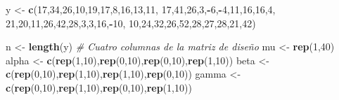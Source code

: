 \documentclass[
]{article}
\newenvironment{Shaded}{\begin{snugshade}}{\end{snugshade}}
\newcommand{\CommentTok}[1]{\textcolor[rgb]{0.56,0.35,0.01}{\textit{#1}}}
\newcommand{\DecValTok}[1]{\textcolor[rgb]{0.00,0.00,0.81}{#1}}
\newcommand{\FunctionTok}[1]{\textcolor[rgb]{0.13,0.29,0.53}{\textbf{#1}}}
\newcommand{\NormalTok}[1]{#1}
\newcommand{\OtherTok}[1]{\textcolor[rgb]{0.56,0.35,0.01}{#1}}
\newcommand{\SpecialCharTok}[1]{\textcolor[rgb]{0.81,0.36,0.00}{\textbf{#1}}}
\begin{document}
\begin{Shaded}
\begin{Highlighting}[]
\NormalTok{y }\OtherTok{\textless{}{-}} \FunctionTok{c}\NormalTok{(}\DecValTok{17}\NormalTok{,}\DecValTok{34}\NormalTok{,}\DecValTok{26}\NormalTok{,}\DecValTok{10}\NormalTok{,}\DecValTok{19}\NormalTok{,}\DecValTok{17}\NormalTok{,}\DecValTok{8}\NormalTok{,}\DecValTok{16}\NormalTok{,}\DecValTok{13}\NormalTok{,}\DecValTok{11}\NormalTok{,}
       \DecValTok{17}\NormalTok{,}\DecValTok{41}\NormalTok{,}\DecValTok{26}\NormalTok{,}\DecValTok{3}\NormalTok{,}\SpecialCharTok{{-}}\DecValTok{6}\NormalTok{,}\SpecialCharTok{{-}}\DecValTok{4}\NormalTok{,}\DecValTok{11}\NormalTok{,}\DecValTok{16}\NormalTok{,}\DecValTok{16}\NormalTok{,}\DecValTok{4}\NormalTok{,}
       \DecValTok{21}\NormalTok{,}\DecValTok{20}\NormalTok{,}\DecValTok{11}\NormalTok{,}\DecValTok{26}\NormalTok{,}\DecValTok{42}\NormalTok{,}\DecValTok{28}\NormalTok{,}\DecValTok{3}\NormalTok{,}\DecValTok{3}\NormalTok{,}\DecValTok{16}\NormalTok{,}\SpecialCharTok{{-}}\DecValTok{10}\NormalTok{,}
       \DecValTok{10}\NormalTok{,}\DecValTok{24}\NormalTok{,}\DecValTok{32}\NormalTok{,}\DecValTok{26}\NormalTok{,}\DecValTok{52}\NormalTok{,}\DecValTok{28}\NormalTok{,}\DecValTok{27}\NormalTok{,}\DecValTok{28}\NormalTok{,}\DecValTok{21}\NormalTok{,}\DecValTok{42}\NormalTok{)}

\NormalTok{n }\OtherTok{\textless{}{-}} \FunctionTok{length}\NormalTok{(y)}
\CommentTok{\# Cuatro columnas de la matriz de diseño}
\NormalTok{mu }\OtherTok{\textless{}{-}} \FunctionTok{rep}\NormalTok{(}\DecValTok{1}\NormalTok{,}\DecValTok{40}\NormalTok{)}
\NormalTok{alpha }\OtherTok{\textless{}{-}} \FunctionTok{c}\NormalTok{(}\FunctionTok{rep}\NormalTok{(}\DecValTok{1}\NormalTok{,}\DecValTok{10}\NormalTok{),}\FunctionTok{rep}\NormalTok{(}\DecValTok{0}\NormalTok{,}\DecValTok{10}\NormalTok{),}\FunctionTok{rep}\NormalTok{(}\DecValTok{0}\NormalTok{,}\DecValTok{10}\NormalTok{),}\FunctionTok{rep}\NormalTok{(}\DecValTok{1}\NormalTok{,}\DecValTok{10}\NormalTok{))}
\NormalTok{beta }\OtherTok{\textless{}{-}} \FunctionTok{c}\NormalTok{(}\FunctionTok{rep}\NormalTok{(}\DecValTok{0}\NormalTok{,}\DecValTok{10}\NormalTok{),}\FunctionTok{rep}\NormalTok{(}\DecValTok{1}\NormalTok{,}\DecValTok{10}\NormalTok{),}\FunctionTok{rep}\NormalTok{(}\DecValTok{1}\NormalTok{,}\DecValTok{10}\NormalTok{),}\FunctionTok{rep}\NormalTok{(}\DecValTok{0}\NormalTok{,}\DecValTok{10}\NormalTok{))}
\NormalTok{gamma }\OtherTok{\textless{}{-}} \FunctionTok{c}\NormalTok{(}\FunctionTok{rep}\NormalTok{(}\DecValTok{0}\NormalTok{,}\DecValTok{10}\NormalTok{),}\FunctionTok{rep}\NormalTok{(}\DecValTok{1}\NormalTok{,}\DecValTok{10}\NormalTok{),}\FunctionTok{rep}\NormalTok{(}\DecValTok{0}\NormalTok{,}\DecValTok{10}\NormalTok{),}\FunctionTok{rep}\NormalTok{(}\DecValTok{1}\NormalTok{,}\DecValTok{10}\NormalTok{))}
\end{Highlighting}
\end{Shaded}
\end{document}
